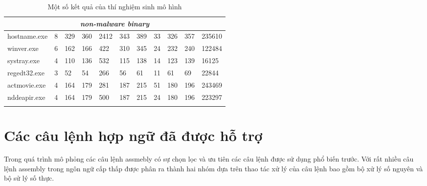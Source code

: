 \begin{small}
\begin{longtable}{|l|l|l|l|l|l|l|l|l|l|l|}
\multicolumn{11}{|c|}{\it non-malware binary}  \\ \hline
hostname.exe	& 8 & 329	& 360 &	2412 &    343 &	389 & 	33 & 326 &  357 & 	235610 \\ \hline
winver.exe	& 6 & 162	& 166 &	422 &	310 &	345 &	24 & 232 &  240 &	122484 \\ \hline
systray.exe	& 4 & 110	& 136 & 532 &	115 & 	138 &	14 & 123 &	139 &	16125 \\ \hline
regedt32.exe	& 3 & 52	& 54  &	266 &	56  &	61  & 	11 & 61  &	69  &	22844 \\ \hline
actmovie.exe	& 4 & 164	& 179 &	281 &	187 & 	215 & 	51 & 180 &	196 &	243469 \\ \hline
nddeapir.exe	& 4& 164	& 179 &	500 &	187 & 	215 & 	24 & 180 &	196 &	223297 \\ \hline

\caption {Một số kết quả của thí nghiệm sinh mô hình}\label{tab:virusExp}
\end{longtable}
\end{small}


		\section{Các câu lệnh hợp ngữ đã được hỗ trợ}
		Trong quá trình mô phỏng các câu lệnh assmebly có sự chọn lọc và ưu tiên các câu lệnh được sử dụng phổ biến trước. Với rất nhiều câu lệnh assembly trong ngôn ngữ cấp thấp được phân ra thành hai nhóm dựa trên thao tác xử lý của câu lệnh bao gồm bộ xử lý số nguyên và bộ sử lý số thực. \\ 
		
